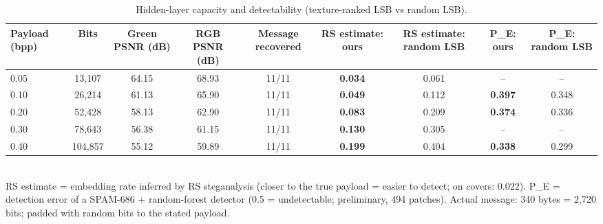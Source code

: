 \begin{table}[t]
\centering
\small
\caption{Hidden-layer capacity and detectability (texture-ranked LSB vs random LSB).}
\begin{tabular}{lcccccccc}
\toprule
Payload (bpp) & Bits & Green PSNR (dB) & RGB PSNR (dB) & Message recovered & RS estimate: ours & RS estimate: random LSB & P_E: ours & P_E: random LSB \\
\midrule
0.05 & 13,107 & 64.15 & 68.93 & 11/11 & \textbf{0.034} & 0.061 & – & – \\
0.10 & 26,214 & 61.13 & 65.90 & 11/11 & \textbf{0.049} & 0.112 & \textbf{0.397} & 0.348 \\
0.20 & 52,428 & 58.13 & 62.90 & 11/11 & \textbf{0.083} & 0.209 & \textbf{0.374} & 0.336 \\
0.30 & 78,643 & 56.38 & 61.15 & 11/11 & \textbf{0.130} & 0.305 & – & – \\
0.40 & 104,857 & 55.12 & 59.89 & 11/11 & \textbf{0.199} & 0.404 & \textbf{0.338} & 0.299 \\
\bottomrule
\end{tabular}
\\[2pt]\footnotesize RS estimate = embedding rate inferred by RS steganalysis (closer to the true payload = easier to detect; on covers: 0.022). P_E = detection error of a SPAM-686 + random-forest detector (0.5 = undetectable; preliminary, 494 patches). Actual message: 340 bytes = 2,720 bits; padded with random bits to the stated payload.
\end{table}
